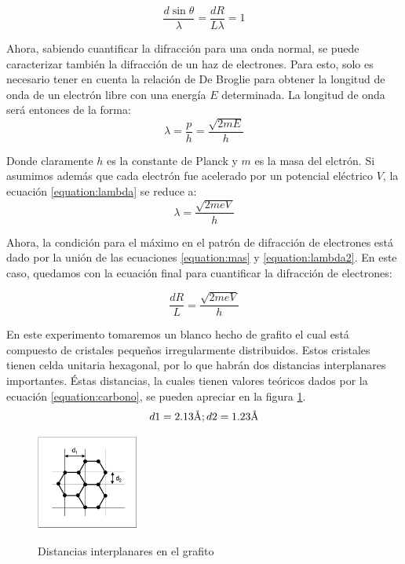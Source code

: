 \documentclass[%
 reprint,
 amsmath,amssymb,
 aps,
]{revtex4-1}
\begin{document}
\begin{equation}
\frac{d\sin{\theta}}{\lambda} = \frac{dR}{L\lambda} = 1
\label{equation:mas}
\end{equation}

Ahora, sabiendo cuantificar la difracción para una onda normal, se puede caracterizar también la difracción de un haz de electrones. Para esto, solo es necesario tener en cuenta la relación de De Broglie para obtener la longitud de onda de un electrón libre con una energía $E$ determinada. La longitud de onda será entonces de la forma:\\

\begin{equation}
\lambda = \frac{p}{h} = \frac{\sqrt{2mE}}{h}
\label{equation:lambda}
\end{equation}

Donde claramente $h$ es la constante de Planck y $m$ es la masa del elctrón. Si asumimos además que cada electrón fue acelerado por un potencial eléctrico $V$, la ecuación \ref{equation:lambda} se reduce a:\\

\begin{equation}
\lambda = \frac{\sqrt{2meV}}{h}
\label{equation:lambda2}
\end{equation}

Ahora, la condición para el máximo en el patrón de difracción de electrones está dado por la unión de las ecuaciones \ref{equation:mas} y \ref{equation:lambda2}. En este caso, quedamos con la ecuación final para cuantificar la difracción de electrones: 

 \begin{equation}
\frac{dR}{L} = \frac{\sqrt{2meV}}{h}
\label{equation:lambda2}
\end{equation}

En este experimento tomaremos un blanco hecho de grafito el cual está compuesto de cristales pequeños irregularmente distribuidos. Estos cristales tienen celda unitaria hexagonal, por lo que habrán dos distancias interplanares importantes. Éstas distancias, la cuales tienen valores teóricos dados por la ecuación \ref{equation:carbono}, se pueden apreciar en la figura \ref{fig:carbono}.\\

\begin{equation}
d1 = 2.13 \textup{\AA} ; d2 = 1.23 \textup{\AA}
\label{equation:carbono}
\end{equation}

\begin{figure}[h]
\caption{Distancias interplanares en el grafito}
\centering
\includegraphics[width=0.30\textwidth]{carbono}
\label{fig:carbono}
\end{figure}
\end{document}

